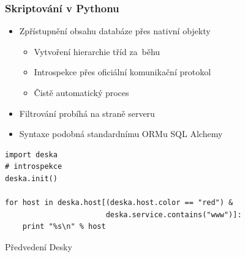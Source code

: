\documentclass{beamer}
\begin{document}
\begin{frame}[fragile]
\begin{columns}
\begin{column}{.55\paperwidth}
\begin{textblock}{50}
\end{textblock}
\end{column}
\end{columns}
\end{frame}


\begin{frame}[fragile]
\frametitle{Skriptování v Pythonu}
\begin{itemize}
    \item Zpřístupnění obsahu databáze přes nativní objekty
        \begin{itemize}
            \item Vytvoření hierarchie tříd za~běhu
            \item Introspekce přes oficiální komunikační protokol
            \item Čistě automatický proces
        \end{itemize}
    \item Filtrování probíhá na straně serveru
    \item Syntaxe podobná standardnímu ORMu SQL Alchemy
\end{itemize}
\begin{verbatim}
import deska
# introspekce
deska.init()

for host in deska.host[(deska.host.color == "red") &
                       deska.service.contains("www")]:
    print "%s\n" % host
\end{verbatim}
\end{frame}


\begin{frame}[fragile]
\begin{center}
Předvedení Desky
\end{center}
\end{frame}
\end{document}
